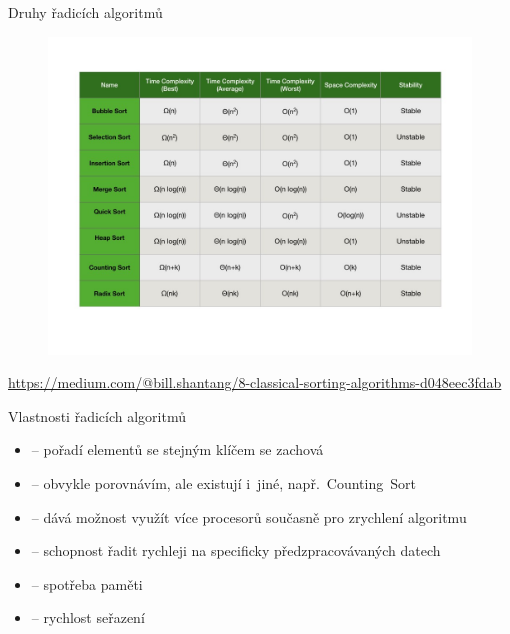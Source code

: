 \documentclass[11pt,final]{beamer}
\begin{document}
	\begin{frame}{Druhy řadicích algoritmů}
		\begin{figure}[h]
			\noindent
			\includegraphics[scale=0.25]{algs.jpeg}
		\end{figure}
	\tiny \url{https://medium.com/@bill.shantang/8-classical-sorting-algorithms-d048eec3fdab}
	\end{frame}

	\begin{frame}{Vlastnosti řadicích algoritmů}
		\begin{itemize}
			\item<1->[$\bullet$] -- pořadí elementů se stejným klíčem se zachová\\
			\item<2->[$\bullet$] -- obvykle porovnávím, ale existují i~jiné, \mbox{např. \alert{Counting Sort}}\\
			\item<3->[$\bullet$] -- dává možnost využít více procesorů současně pro zrychlení algoritmu\\
			\item<4->[$\bullet$] -- schopnost řadit rychleji na specificky předzpracovávaných datech\\
			\item<5->[$\bullet$] -- spotřeba paměti\\
			\item<6->[$\bullet$] -- rychlost seřazení 
		\end{itemize}
	\end{frame}
\end{document}
